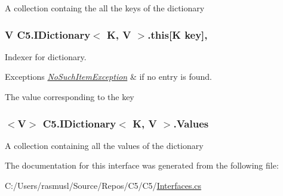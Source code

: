 A collection containg the all the keys of the dictionary\hypertarget{interface_c5_1_1_i_dictionary_af9e15cebc5c8d59357b5b3bd9d2a7abd}{}
\subsubsection[{this[K key]}]{\setlength{\rightskip}{0pt plus 5cm}V {\bf C5.\+I\+Dictionary}$<$ K, V $>$.this\mbox{[}K key\mbox{]}\hspace{0.3cm}{\ttfamily [get]}, {\ttfamily [set]}}\label{interface_c5_1_1_i_dictionary_af9e15cebc5c8d59357b5b3bd9d2a7abd}


Indexer for dictionary. 


\begin{DoxyExceptions}{Exceptions}
{\em \hyperlink{class_c5_1_1_no_such_item_exception}{No\+Such\+Item\+Exception}} & if no entry is found. \\
\hline
\end{DoxyExceptions}


The value corresponding to the key\hypertarget{interface_c5_1_1_i_dictionary_a3c84724a5e4993d0b1e92878829af887}{}
\subsubsection[{Values}]{$<$V$>$ {\bf C5.\+I\+Dictionary}$<$ K, V $>$.Values\hspace{0.3cm}{\ttfamily [get]}}\label{interface_c5_1_1_i_dictionary_a3c84724a5e4993d0b1e92878829af887}




A collection containing all the values of the dictionary

The documentation for this interface was generated from the following file\+:\begin{DoxyCompactItemize}
\item 
C\+:/\+Users/rasmusl/\+Source/\+Repos/\+C5/\+C5/\hyperlink{_interfaces_8cs}{Interfaces.\+cs}\end{DoxyCompactItemize}
